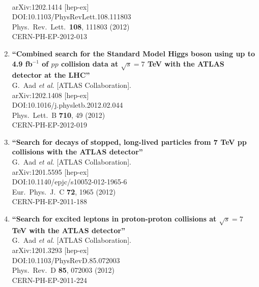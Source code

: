 \documentclass{article}
\begin{document}
\begin{enumerate}
  \\{}arXiv:1202.1414 [hep-ex]
  \\{}DOI:10.1103/PhysRevLett.108.111803
  \\{}Phys.\ Rev.\ Lett.\  {\bf 108}, 111803 (2012)
  \\{}CERN-PH-EP-2012-013
\item%
{\bf ``Combined search for the Standard Model Higgs boson using up to 4.9 fb$^{-1}$ of $pp$ collision data at $\sqrt{s}=7$ TeV with the ATLAS detector at the LHC''}
  \\{}G.~Aad {\it et al.} [ATLAS Collaboration].
  \\{}arXiv:1202.1408 [hep-ex]
  \\{}DOI:10.1016/j.physletb.2012.02.044
  \\{}Phys.\ Lett.\ B {\bf 710}, 49 (2012)
  \\{}CERN-PH-EP-2012-019
\item%
{\bf ``Search for decays of stopped, long-lived particles from 7 TeV pp collisions with the ATLAS detector''}
  \\{}G.~Aad {\it et al.} [ATLAS Collaboration].
  \\{}arXiv:1201.5595 [hep-ex]
  \\{}DOI:10.1140/epjc/s10052-012-1965-6
  \\{}Eur.\ Phys.\ J.\ C {\bf 72}, 1965 (2012)
  \\{}CERN-PH-EP-2011-188
\item%
{\bf ``Search for excited leptons in proton-proton collisions at $\sqrt{s}=7$ TeV with the ATLAS detector''}
  \\{}G.~Aad {\it et al.} [ATLAS Collaboration].
  \\{}arXiv:1201.3293 [hep-ex]
  \\{}DOI:10.1103/PhysRevD.85.072003
  \\{}Phys.\ Rev.\ D {\bf 85}, 072003 (2012)
  \\{}CERN-PH-EP-2011-224

\end{enumerate}
\end{document}
